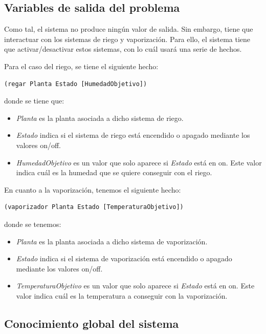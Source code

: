 \documentclass[11pt,a4paper]{article}
\begin{document}
\subsection{Variables de salida del problema}

Como tal, el sistema no produce ningún valor de salida. Sin embargo, tiene que interactuar con los sistemas de riego y vaporización.
Para ello, el sistema tiene que activar/desactivar estos sistemas, con lo cuál usará una serie de hechos.

Para el caso del riego, se tiene el siguiente hecho:

\begin{lstlisting}
(regar Planta Estado [HumedadObjetivo])
\end{lstlisting}

\noindent donde se tiene que:

\begin{itemize}
	\item \textit{Planta} es la planta asociada a dicho sistema de riego.
	\item \textit{Estado} indica si el sistema de riego está encendido o apagado mediante los valores on/off.
	\item \textit{HumedadObjetivo} es un valor que solo aparece si \textit{Estado} está en on. Este valor indica cuál es la humedad
	que se quiere conseguir con el riego.
\end{itemize}

En cuanto a la vaporización, tenemos el siguiente hecho:

\begin{lstlisting}
(vaporizador Planta Estado [TemperaturaObjetivo])
\end{lstlisting}

\noindent donde se tenemos:

\begin{itemize}
	\item \textit{Planta} es la planta asociada a dicho sistema de vaporización.
	\item \textit{Estado} indica si el sistema de vaporización está encendido o apagado mediante los valores on/off.
	\item \textit{TemperaturaObjetivo} es un valor que solo aparece si \textit{Estado} está en on. Este valor indica cuál es la
	temperatura a conseguir con la vaporización.
\end{itemize}

\subsection{Conocimiento global del sistema}
\end{document}
